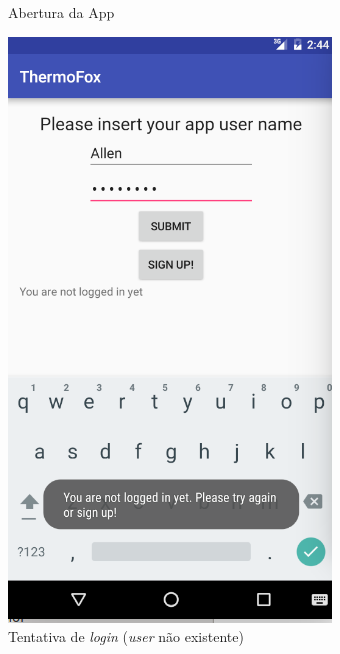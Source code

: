 \documentclass[a4paper]{article}
\begin{document}
\begin{figure}[H]
  \caption{Abertura da App}\label{fig:welcome}
\endminipage\hfill
{}
  \includegraphics[width=\linewidth]{welcome.png}
  \caption{Tentativa de \textit{login} (\textit{user} não existente)}\label{fig:newUser}
\endminipage\hfill
{}%

\end{figure}
\end{document}
